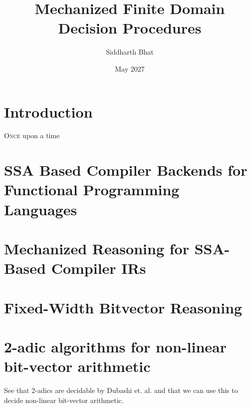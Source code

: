 \documentclass[withindex,glossary]{cam-thesis}
\title{Mechanized  Finite Domain Decision Procedures}
\author{Siddharth Bhat}
\date{May 2027}
\begin{document}
\frontmatter{}



\chapter{Introduction}

\lettrine{O}{nce} upon a time
% 
% 
 
\chapter{SSA Based Compiler Backends for Functional Programming Languages}

\chapter{Mechanized Reasoning for SSA-Based Compiler IRs}

\chapter{Fixed-Width Bitvector Reasoning}


\chapter{2-adic algorithms for non-linear bit-vector arithmetic}

See that 2-adics are decidable by Dubashi et. al. and that we can use this to
decide non-linear bit-vector arithmetic.
\end{document}
